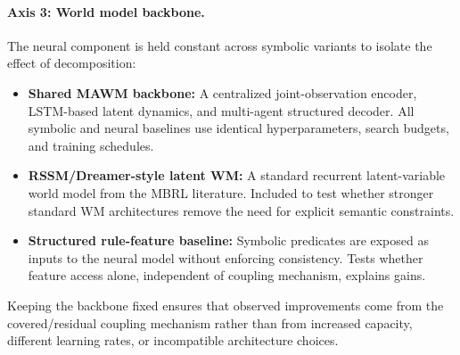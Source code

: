 \documentclass{article}
\theoremstyle{plain}
\theoremstyle{definition}
\theoremstyle{remark}
\begin{document}
\paragraph{Axis 3: World model backbone.}
The neural component is held constant across symbolic variants to isolate the effect of decomposition:
\begin{itemize}
  \item \textbf{Shared MAWM backbone:} A centralized joint-observation encoder, LSTM-based latent dynamics, and multi-agent structured decoder. All symbolic and neural baselines use identical hyperparameters, search budgets, and training schedules.
  \item \textbf{RSSM/Dreamer-style latent WM:} A standard recurrent latent-variable world model from the MBRL literature. Included to test whether stronger standard WM architectures remove the need for explicit semantic constraints.
  \item \textbf{Structured rule-feature baseline:} Symbolic predicates are exposed as inputs to the neural model without enforcing consistency. Tests whether feature access alone, independent of coupling mechanism, explains gains.
\end{itemize}

Keeping the backbone fixed ensures that observed improvements come from the covered/residual coupling mechanism rather than from increased capacity, different learning rates, or incompatible architecture choices.

% 
\end{document}
